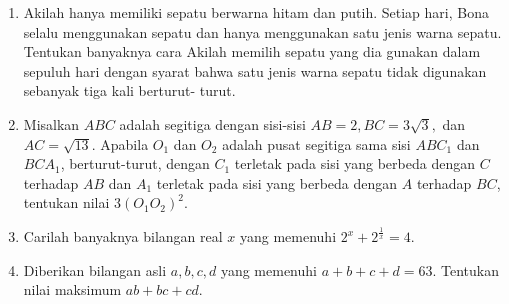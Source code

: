 \documentclass[12pt]{scrartcl}
\begin{document}
\begin{enumerate}[resume]
		\item Akilah hanya memiliki sepatu berwarna hitam dan putih. Setiap hari, Bona selalu menggunakan sepatu dan hanya menggunakan satu jenis warna sepatu. Tentukan banyaknya cara Akilah memilih sepatu yang dia gunakan dalam sepuluh hari dengan syarat bahwa satu jenis warna sepatu tidak digunakan sebanyak tiga kali berturut-
		turut.
		
		\item Misalkan $ABC$ adalah segitiga dengan sisi-sisi $AB = 2, BC = 3\sqrt{3}, $ dan $ AC = \sqrt{13}$. Apabila $O_1$ dan $O_2$ adalah pusat segitiga sama sisi $ABC_1 $ dan $ BCA_1$, berturut-turut, dengan $C_1$ terletak pada sisi yang berbeda dengan $C$ terhadap $AB$ dan $A_1$ terletak pada sisi yang berbeda dengan $A$ terhadap $BC$, tentukan nilai $3(O_1O_2)^2$.
		
		\item Carilah banyaknya bilangan real $x$ yang memenuhi $2^x+2^{\frac{1}{x}}=4$.
		
		\item Diberikan bilangan asli $a,b,c,d$ yang memenuhi $a+b+c+d=63$. Tentukan nilai maksimum $ab+bc+cd$.
\end{enumerate}
\end{document}

